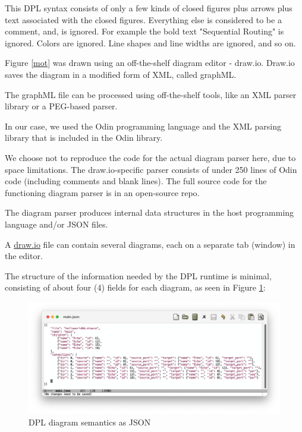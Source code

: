 \documentclass[10pt,anonymous,review]{acmart}
\begin{document}
This DPL syntax consists of only a few kinds of closed figures plus
arrows plus text associated with the closed figures. Everything else is
considered to be a comment, and, is ignored. For example the bold text
"Sequential Routing" is ignored. Colors are ignored. Line shapes and
line widths are ignored, and so on.

Figure \ref{mot} was drawn using an off-the-shelf diagram editor -
draw.io\cite{diagrams_net}. Draw.io saves the diagram in a modified form of XML, called graphML\cite{graphml}.

The graphML file can be processed using off-the-shelf tools, like an XML parser library or a PEG\cite{peg}-based parser\cite{ohmjs}.

In our case, we used the Odin programming language\cite{odin} and the XML parsing library that is included in the Odin library.

We choose not to reproduce the code for the actual diagram parser here, due to space limitations. The draw.io-specific parser consists of under 250 lines of Odin code (including comments and blank lines). The full source code for the functioning diagram parser is in an open-source repo\cite{d2j}.

The diagram parser produces internal data structures in the host programming language and/or JSON\cite{json} files.

A \href{http://draw.io}{draw.io} file can contain several diagrams, each on a separate tab (window) in the editor.

The structure of the information needed by the DPL runtime is minimal, consisting of about four (4) fields for each diagram, as seen in Figure \ref{main}:

\vspace{0.3\baselineskip}

\begin{figure}[h]
    \includegraphics[trim=1cm 2cm 1.5cm 1cm, clip, scale=0.4]{./media/main.png}
    \caption{DPL diagram semantics as JSON}
    \label{main}
\end{figure}
\end{document}
